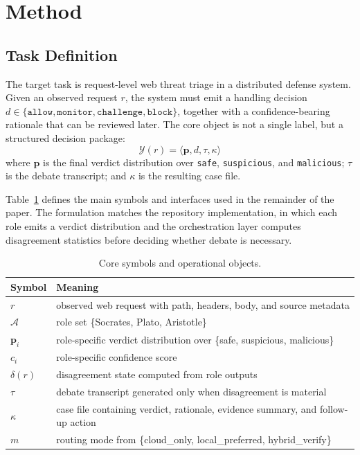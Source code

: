 \section{Method}\label{sec:method}

\subsection{Task Definition}

The target task is request-level web threat triage in a distributed defense system. Given an observed request $r$, the system must emit a handling decision $d \in \{\texttt{allow}, \texttt{monitor}, \texttt{challenge}, \texttt{block}\}$, together with a confidence-bearing rationale that can be reviewed later. The core object is not a single label, but a structured decision package:
\[
\mathcal{Y}(r) = \langle \mathbf{p}, d, \tau, \kappa \rangle
\]
where $\mathbf{p}$ is the final verdict distribution over \texttt{safe}, \texttt{suspicious}, and \texttt{malicious}; $\tau$ is the debate transcript; and $\kappa$ is the resulting case file.

Table~\ref{tab:symbols} defines the main symbols and interfaces used in the remainder of the paper. The formulation matches the repository implementation, in which each role emits a verdict distribution and the orchestration layer computes disagreement statistics before deciding whether debate is necessary.

\begin{table}[t]
  \centering
  \caption{Core symbols and operational objects.}
  \label{tab:symbols}
  \begin{tabular}{p{}p{}}
    \toprule
    Symbol & Meaning \\
    \midrule
    $r$ & observed web request with path, headers, body, and source metadata \\
    $\mathcal{A}$ & role set \{Socrates, Plato, Aristotle\} \\
    $\mathbf{p}_i$ & role-specific verdict distribution over \{safe, suspicious, malicious\} \\
    $c_i$ & role-specific confidence score \\
    $\delta(r)$ & disagreement state computed from role outputs \\
    $\tau$ & debate transcript generated only when disagreement is material \\
    $\kappa$ & case file containing verdict, rationale, evidence summary, and follow-up action \\
    $m$ & routing mode from \{cloud\_only, local\_preferred, hybrid\_verify\} \\
    \bottomrule
  \end{tabular}
\end{table}

